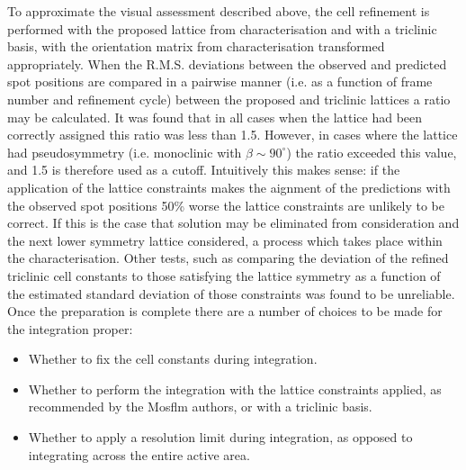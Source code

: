 \documentclass[preprint,pdf]{iucr}
\begin{document}
To approximate the visual assessment described above, the cell
refinement is performed with the proposed lattice from
characterisation and with a triclinic 
basis, with the orientation matrix from
characterisation transformed appropriately. When the R.M.S. deviations
between the observed and predicted spot positions are compared in a
pairwise manner (i.e. as a function of frame number and refinement
cycle) between the proposed and triclinic lattices
a ratio may be calculated. It was found that in
all cases when the lattice had been correctly assigned this ratio was
less than 1.5. However, in cases where the lattice had pseudosymmetry
(i.e. monoclinic with $\beta \sim 90^{\circ}$)
the ratio exceeded this value, and 1.5 is therefore used as a
cutoff. Intuitively this makes sense: if the application of the
lattice constraints makes the aignment of the predictions with the
observed spot positions 50\% worse the lattice constraints are
unlikely to be correct. If this is the case that solution may be
eliminated from consideration and the next lower symmetry lattice
considered, a process which takes place within the characterisation.
Other tests, such as comparing the deviation of the refined triclinic
cell constants to those satisfying the lattice symmetry as a function
of the estimated standard deviation of those constraints was found to
be unreliable. Once the preparation is complete there are a number of
choices to be made for the integration proper:

\begin{itemize}
\item{Whether to fix the cell constants during integration.}
\item{Whether to perform the integration with the lattice constraints
    applied, as recommended by the Mosflm authors, or with a triclinic
    basis.}
\item{Whether to apply a resolution limit during integration,
    as opposed to integrating across the entire active area.}
\end{itemize}
\end{document}
